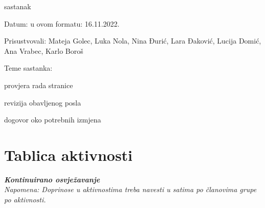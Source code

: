 \begin{packed_enum}
			\item  sastanak
			\item[] \begin{packed_item}
				\item Datum: u ovom formatu: 16.11.2022.
				\item Prisustvovali: Mateja Golec, Luka Nola, Nina Đurić, Lara Đaković, Lucija Domić, Ana Vrabec, Karlo Boroš
				\item Teme sastanka:
				\begin{packed_item}
				    \item  provjera rada stranice
					\item  revizija obavljenog posla
					\item  dogovor oko potrebnih izmjena
				\end{packed_item}
			\end{packed_item}

		\end{packed_enum}
		
		\eject
		\section*{Tablica aktivnosti}
		
			\textbf{\textit{Kontinuirano osvježavanje}}\\
			
			 \textit{Napomena: Doprinose u aktivnostima treba navesti u satima po članovima grupe po aktivnosti.}

